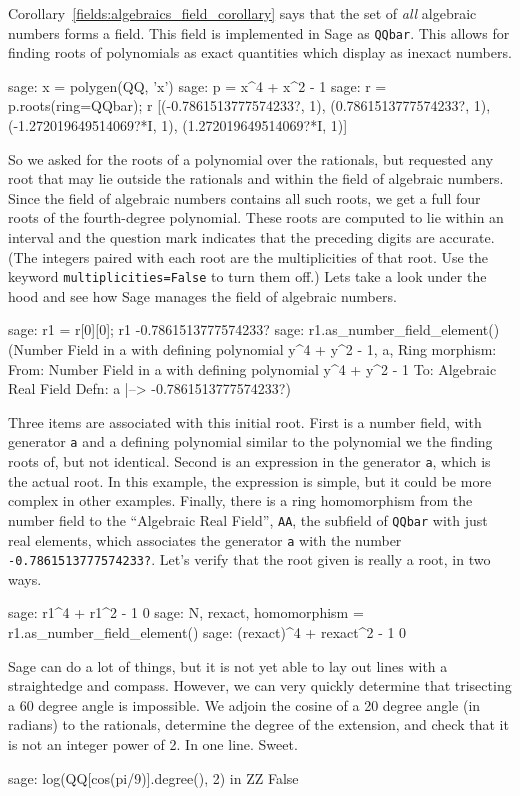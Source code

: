 %
%
Corollary~\ref{fields:algebraics_field_corollary} says that the set of \emph{all} algebraic numbers forms a field.  This field is implemented in Sage as \verb?QQbar?.  This allows for finding roots of polynomials as exact quantities which display as inexact numbers.
%
\begin{sageexample}
sage: x = polygen(QQ, 'x')
sage: p = x^4 + x^2 - 1
sage: r = p.roots(ring=QQbar); r
[(-0.7861513777574233?,  1), (0.7861513777574233?,  1),
 (-1.272019649514069?*I, 1), (1.272019649514069?*I, 1)]
\end{sageexample}
%
So we asked for the roots of a polynomial over the rationals, but requested any root that may lie outside the rationals and within the field of algebraic numbers.  Since the field of algebraic numbers contains all such roots, we get a full four roots of the fourth-degree polynomial.  These roots are computed to lie within an interval and the question mark indicates that the preceding digits are accurate.  (The integers paired with each root are the multiplicities of that root. Use the keyword \verb?multiplicities=False? to turn them off.)  Lets take a look under the hood and see how Sage manages the field of algebraic numbers.
%
\begin{sageexample}
sage: r1 = r[0][0]; r1
-0.7861513777574233?
sage: r1.as_number_field_element()
(Number Field in a with defining polynomial y^4 + y^2 - 1, a, Ring morphism:
    From: Number Field in a with defining polynomial y^4 + y^2 - 1
    To:   Algebraic Real Field
    Defn: a |--> -0.7861513777574233?)
\end{sageexample}
%
Three items are associated with this initial root.  First is a number field, with generator \verb?a? and a defining polynomial similar to the polynomial we the finding roots of, but not identical.  Second is an expression in the generator \verb?a?, which is the actual root.  In this example, the expression is simple, but it could be more complex in other examples.  Finally, there is a ring homomorphism from the number field to the ``Algebraic Real Field'', \verb?AA?, the subfield of \verb?QQbar? with just real elements, which associates the generator \verb?a? with the number \verb!-0.7861513777574233?!.  Let's verify that the root given is really a root, in two ways.
%
\begin{sageexample}
sage: r1^4 + r1^2 - 1
0
sage: N, rexact, homomorphism = r1.as_number_field_element()
sage: (rexact)^4 + rexact^2 - 1
0
\end{sageexample}
%
%
Sage can do a lot of things, but it is not yet able to lay out lines with a straightedge and compass.  However, we can very quickly determine that trisecting a 60 degree angle is impossible.  We adjoin the cosine of a 20 degree angle (in radians) to the rationals, determine the degree of the extension, and check that it is not an integer power of 2.  In one line.  Sweet.
%
\begin{sageexample}
sage: log(QQ[cos(pi/9)].degree(), 2) in ZZ
False
\end{sageexample}
%
